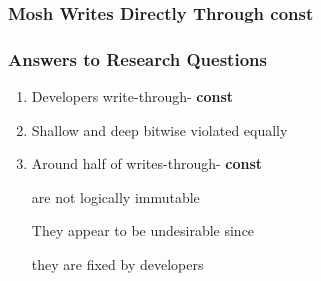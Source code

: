 \documentclass[aspectratio=43]{beamer}
\newcommand{\const}{{\color{blue} \bfseries \ttfamily const}}
\begin{document}
  \begin{frame}
    \frametitle{Mosh Writes Directly Through \const{}}
    \centering
    \small
  \end{frame}

  \begin{frame}
    \frametitle{Answers to Research Questions}
    \large
    \begin{enumerate}
      \setlength\itemsep{0.5em}
      \item Developers write-through-\const{}
      \item Shallow and deep bitwise violated equally
      \item Around half of writes-through-\const{}

            are not logically immutable

            \vspace{2em}
            They appear to be undesirable since

            they are fixed by developers
    \end{enumerate}
  \end{frame}
\end{document}
